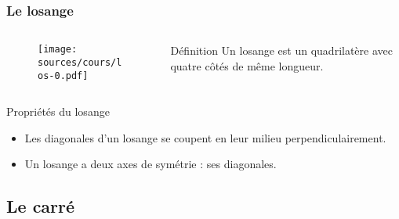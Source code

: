 \documentclass{beamer}
\begin{document}
\begin{frame}
  \frametitle{Le losange}
  
  \begin{columns}[t]
    \begin{column}{4cm}
      \begin{block}{}	
        \begin{figure}[H]
          \centering
          \texttt{[image: sources/cours/los-0.pdf]}
        \end{figure}
      \end{block} 
    \end{column}
    \begin{column}{6cm}
      \begin{alertblock}{Définition}	
	Un losange est un quadrilatère avec quatre côtés de même longueur.
      \end{alertblock}
    \end{column}
  \end{columns} 
  
  \begin{block}{Propriétés du losange}	
    \begin{itemize}
    \item Les diagonales d'un losange se coupent en leur milieu perpendiculairement.
    \item Un losange a deux axes de symétrie : ses diagonales.
    \end{itemize}
  \end{block} 
  
\end{frame}

\subsection{Le carré}
\end{document}
